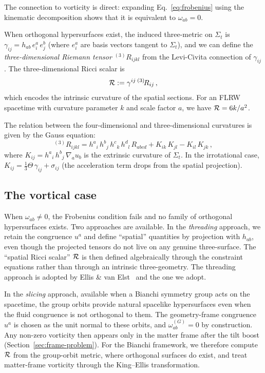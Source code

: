 \noindent
The connection to vorticity is direct: expanding
Eq.~\eqref{eq:frobenius} using the kinematic decomposition
shows that it is equivalent to $\omega_{ab} = 0$.

When orthogonal hypersurfaces exist, the induced three-metric
on $\Sigma_t$ is $\gamma_{ij} = h_{ab}\,e^a_i\,e^b_j$
(where $e^a_i$ are basis vectors tangent to $\Sigma_t$), and
we can define the \emph{three-dimensional Riemann tensor}
${}^{(3)}\!R_{ijkl}$ from the Levi-Civita connection of
$\gamma_{ij}$.  The three-dimensional Ricci scalar is
\begin{equation}\label{eq:3Ricci}
\mathcal{R} := \gamma^{ij}\,{}^{(3)}\!R_{ij}\,,
\end{equation}
which encodes the intrinsic curvature of the spatial sections.
For an FLRW spacetime with curvature parameter $k$ and scale
factor $a$, we have $\mathcal{R} = 6k/a^2$.

The relation between the four-dimensional and
three-dimensional curvatures is given by the Gauss equation:
\begin{equation}\label{eq:gauss}
{}^{(3)}\!R_{ijkl}
= h^a{}_i\,h^b{}_j\,h^c{}_k\,h^d{}_l\,R_{abcd}
  + K_{ik}\,K_{jl} - K_{il}\,K_{jk}\,,
\end{equation}
where $K_{ij} = h^a{}_i\,h^b{}_j\,\nabla_a u_b$ is the
extrinsic curvature of $\Sigma_t$.  In the irrotational case,
$K_{ij} = \frac{1}{3}\Theta\,\gamma_{ij} + \sigma_{ij}$
(the acceleration term drops from the spatial projection).


\subsection{The vortical case}\label{sec:vort-spatial}

When $\omega_{ab} \neq 0$, the Frobenius condition fails and
no family of orthogonal hypersurfaces exists.  Two approaches
are available.  In the \emph{threading} approach, we retain
the congruence $u^a$ and define ``spatial'' quantities by
projection with $h_{ab}$, even though the projected tensors do
not live on any genuine three-surface.  The ``spatial Ricci
scalar'' $\mathcal{R}$ is then defined algebraically through the
constraint equations rather than through an intrinsic
three-geometry.  The threading approach is adopted by Ellis \& van
Elst~\cite{EllisVanElst1999} and the one we adopt.

In the \emph{slicing} approach, available when a Bianchi
symmetry group acts on the spacetime, the group orbits
provide natural spacelike hypersurfaces even when the fluid
congruence is not orthogonal to them.  The geometry-frame
congruence $u^a$ is chosen as the unit normal to these orbits,
and $\omega_{ab}^{(G)} = 0$ by construction.  Any non-zero
vorticity then appears only in the matter frame after the tilt
boost (Section~\ref{sec:frame-problem}).  For the Bianchi
framework, we therefore compute $\mathcal{R}$ from the group-orbit
metric, where orthogonal surfaces do exist, and treat
matter-frame vorticity through the King--Ellis
transformation.

